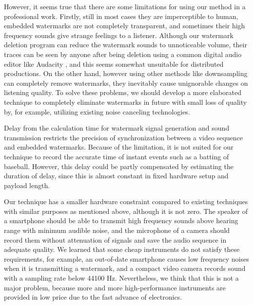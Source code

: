 However, it seems true that there are some limitations for using our method in a professional work.
Firstly, still in most cases they are imperceptible to human, embedded watermarks are not completely transparent, and sometimes their high frequency sounds give strange feelings to a listener.
Although our watermark deletion program can reduce the watermark sounds to unnoticeable volume, their traces can be seen by anyone after being deletion using a common digital audio editor like Audacity \cite{audacity}, and this seems somewhat unsuitable for distributed productions.
On the other hand, however using other methods like downsampling can completely remove watermarks, they inevitably cause unignorable changes on listening quality.
To solve these problems, we should develop a more elaborated technique to completely eliminate watermarks in future with small loss of quality by, for example, utilizing existing noise canceling technologies.

Delay from the calculation time for watermark signal generation and sound transmission restricts the precision of synchronization between a video sequence and embedded watermarks.
Because of the limitation, it is not suited for our technique to record the accurate time of instant events such as a batting of baseball.
However, this delay could be partly compensated by estimating the duration of delay, since this is almost constant in fixed hardware setup and payload length.

Our technique has a smaller hardware constraint compared to existing techniques with similar purposes as mentioned above, although it is not zero.
The speaker of a smartphone should be able to transmit high frequency sounds above hearing range with minimum audible noise, and the microphone of a camera should record them without attenuation of signals and save the audio sequence in adequate quality.
We learned that some cheap instruments do not satisfy these requirements, for example, an out-of-date smartphone causes low frequency noises when it is transmitting a watermark, and a compact video camera records sound with a sampling rate below 44100 Hz.
Nevertheless, we think that this is not a major problem, because more and more high-performance instruments are provided in low price due to the fast advance of electronics.
